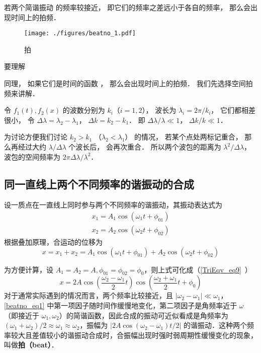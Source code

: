 
\begin{issues}
\issueDraft
\end{issues}


若两个简谐振动 的频率较接近， 即它们的频率之差远小于各自的频率， 那么会出现时间上的拍频．
\begin{figure}[ht]
\centering
\texttt{[image: ./figures/beatno\_1.pdf]}
\caption{拍} \label{beatno_fig1}
\end{figure}

要理解

同理， 如果它们是时间的函数 ， 那么会出现时间上的拍频． 我们先选择空间拍频来讲解．

令 $f_1(t), f_2(x)$ 的波数分别为 $k_i$（$i=1,2$）， 波长为 $\lambda_i = 2\pi/k_i$， 它们都相差很小， 令 $\Delta \lambda = \lambda_2 - \lambda_1$， $\Delta k = k_2 - k_1$． 即 $\Delta \lambda/\lambda \ll 1$， $\Delta k/k \ll 1$．

为讨论方便我们讨论 $k_2 > k_1$ （$\lambda_2 < \lambda_1$） 的情况， 若某个点处两标记重合， 那么再经过大约 $\lambda/\Delta\lambda$ 个波长后， 会再次重合． 所以两个波包的距离为 $\lambda^2/\Delta\lambda$， 波包的空间频率为 $2\pi \Delta \lambda/\lambda^2$．


\subsection{同一直线上两个不同频率的谐振动的合成}

设一质点在一直线上同时参与两个不同频率的谐振动，其振动表达式为
\begin{equation}
\begin{array}{l}x_{1}=A_{1} \cos \left(\omega_{1} t+\phi_{01}\right) \\ x_{2}=A_{2} \cos \left(\omega_{2} t+\phi_{02}\right)\end{array}
\end{equation}
根据叠加原理，合运动的位移为
\begin{equation}
x=x_{1}+x_{2}=A_{1} \cos \left(\omega_{1} t+\phi_{01}\right)+A_{2} \cos \left(\omega_{2} t+\phi_{02}\right)
\end{equation}

为方便计算，设 $A_1=A_2=A,\phi_{01}=\phi_{02}=\phi_{0}$，则上式可化成（\autoref{TriEqv_eq9}~）
\begin{equation} \label{beatno_eq1}
x=2 A \cos \left(\frac{\omega_{2}-\omega_{1}}{2} t\right) \cos \left(\frac{\omega_{2}+\omega_{1}}{2} t+\phi_{0}\right)
\end{equation}
对于通常实际遇到的情况而言，两个频率比较接近，且 $\left|\omega_{2}-\omega_{1}\right|\ll \omega_1$，\autoref{beatno_eq1} 中第一项因子随时间作缓慢地变化，第二项因子是角频率近于 $\omega$（即接近于 $\omega_1,\omega_2$）的简谐函数，因此合成的振动可近似看成是角频率为 $(\omega_{1}+\omega_{2})/2 \approx \omega_{1} \approx \omega_{2}$，振幅为 $\left | 2 A \cos (\omega_{2}-\omega_{1})t/{2} \right |$ 的谐振动．这种两个频率较大且差值较小的谐振动合成时，合振幅出现时强时弱周期性缓慢变化的现象，叫做\textbf{拍（beat）}．


